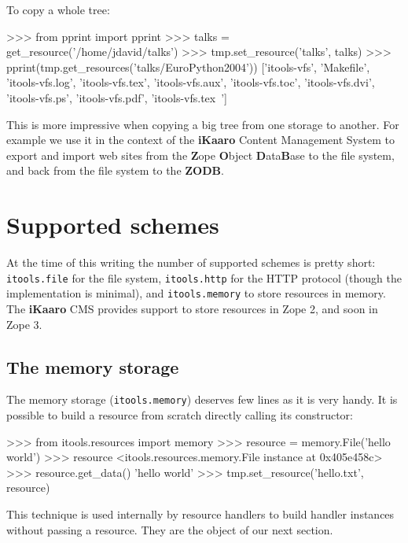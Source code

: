 To copy a whole tree:

\begin{code}
    >>> from pprint import pprint
    >>> talks = get_resource('/home/jdavid/talks')
    >>> tmp.set_resource('talks', talks)
    >>> pprint(tmp.get_resources('talks/EuroPython2004'))
    ['itools-vfs',
     'Makefile',
     'itools-vfs.log',
     'itools-vfs.tex',
     'itools-vfs.aux',
     'itools-vfs.toc',
     'itools-vfs.dvi',
     'itools-vfs.ps',
     'itools-vfs.pdf',
     'itools-vfs.tex~']
\end{code}

This is more impressive when copying a big tree from one storage to another.
For example we use it in the context of the {\bf iKaaro} Content Management
System to export and import web sites from the {\bf Z}ope {\bf O}bject
{\bf D}ata{\bf B}ase to the file system, and back from the file system to the
{\bf ZODB}.


\section{Supported schemes}

At the time of this writing the number of supported schemes is pretty short:
{\tt itools.file} for the file system, {\tt itools.http} for the HTTP
protocol (though the implementation is minimal), and {\tt itools.memory}
to store resources in memory. The {\bf iKaaro} CMS provides support to
store resources in Zope 2, and soon in Zope 3.

\subsection{The memory storage}

The memory storage ({\tt itools.memory}) deserves few lines as it is very
handy. It is possible to build a resource from scratch directly calling its
constructor:

\begin{code}
    >>> from itools.resources import memory
    >>> resource = memory.File('hello world')
    >>> resource
    <itools.resources.memory.File instance at 0x405e458c>
    >>> resource.get_data()
    'hello world'
    >>> tmp.set_resource('hello.txt', resource)
\end{code}

This technique is used internally by resource handlers to build handler
instances without passing a resource. They are the object of our next
section.
